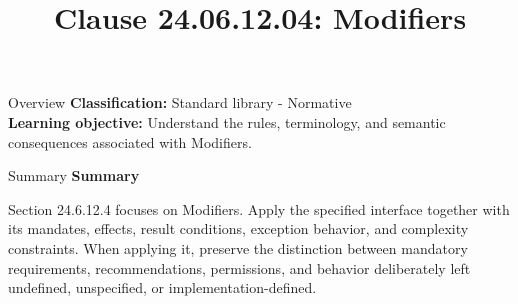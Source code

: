 \documentclass[10pt,letterpaper]{article}
\title{Clause 24.06.12.04: Modifiers}
\author{}
\date{}
\begin{document}
\maketitle
\begin{CornellOverviewBox}{Overview}
\textbf{Classification:} Standard library - Normative\\[2pt]
\textbf{Learning objective:} Understand the rules, terminology, and semantic consequences associated with Modifiers.
\end{CornellOverviewBox}\begin{CornellSummaryBox}{Summary}
{\sffamily\bfseries\color{Accent} Summary}\par\vspace{3pt}Section 24.6.12.4 focuses on Modifiers. Apply the specified interface together with its mandates, effects, result conditions, exception behavior, and complexity constraints. When applying it, preserve the distinction between mandatory requirements, recommendations, permissions, and behavior deliberately left undefined, unspecified, or implementation-defined.
\end{CornellSummaryBox}
\end{document}
